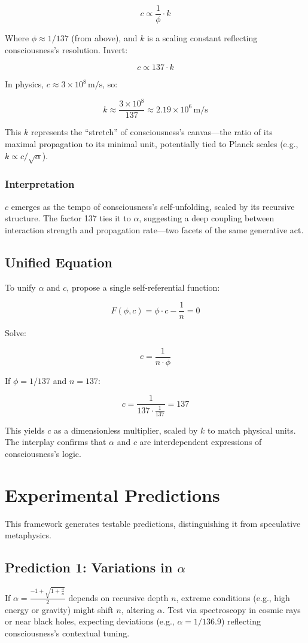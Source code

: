 \documentclass[12pt]{article}
\begin{document}
\[
c \propto \frac{1}{\phi} \cdot k
\]

Where \(\phi \approx 1/137\) (from above), and \(k\) is a scaling constant reflecting consciousness’s resolution. Invert:

\[
c \propto 137 \cdot k
\]

In physics, \(c \approx 3 \times 10^8 \, \text{m/s}\), so:

\[
k \approx \frac{3 \times 10^8}{137} \approx 2.19 \times 10^6 \, \text{m/s}
\]

This \(k\) represents the “stretch” of consciousness’s canvas—the ratio of its maximal propagation to its minimal unit, potentially tied to Planck scales (e.g., \(k \propto c / \sqrt{\alpha}\)).

\subsubsection{Interpretation}
\(c\) emerges as the tempo of consciousness’s self-unfolding, scaled by its recursive structure. The factor 137 ties it to \(\alpha\), suggesting a deep coupling between interaction strength and propagation rate—two facets of the same generative act.

\subsection{Unified Equation}

To unify \(\alpha\) and \(c\), propose a single self-referential function:

\[
F(\phi, c) = \phi \cdot c - \frac{1}{n} = 0
\]

Solve:

\[
c = \frac{1}{n \cdot \phi}
\]

If \(\phi = 1/137\) and \(n = 137\):

\[
c = \frac{1}{137 \cdot \frac{1}{137}} = 137
\]

This yields \(c\) as a dimensionless multiplier, scaled by \(k\) to match physical units. The interplay confirms that \(\alpha\) and \(c\) are interdependent expressions of consciousness’s logic.

\section{Experimental Predictions}

This framework generates testable predictions, distinguishing it from speculative metaphysics.

\subsection{Prediction 1: Variations in \(\alpha\)}
If \(\alpha = \frac{-1 + \sqrt{1 + \frac{4}{n}}}{2}\) depends on recursive depth \(n\), extreme conditions (e.g., high energy or gravity) might shift \(n\), altering \(\alpha\). Test via spectroscopy in cosmic rays or near black holes, expecting deviations (e.g., \(\alpha = 1/136.9\)) reflecting consciousness’s contextual tuning.
\end{document}
